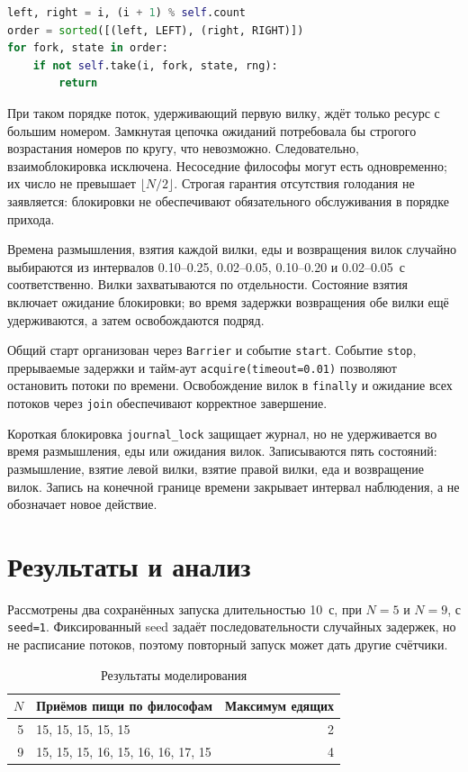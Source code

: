 \documentclass[a4paper,14pt]{extarticle}
\begin{document}
\begin{lstlisting}[language=Python,caption={Порядок захвата вилок}]
left, right = i, (i + 1) % self.count
order = sorted([(left, LEFT), (right, RIGHT)])
for fork, state in order:
    if not self.take(i, fork, state, rng):
        return
\end{lstlisting}

При таком порядке поток, удерживающий первую вилку, ждёт только ресурс
с большим номером. Замкнутая цепочка ожиданий потребовала бы строгого
возрастания номеров по кругу, что невозможно. Следовательно,
взаимоблокировка исключена. Несоседние философы могут есть одновременно;
их число не превышает $\lfloor N/2\rfloor$.
Строгая гарантия отсутствия голодания не заявляется: блокировки не
обеспечивают обязательного обслуживания в порядке прихода.

Времена размышления, взятия каждой вилки, еды и возвращения вилок
случайно выбираются из интервалов 0.10--0.25, 0.02--0.05,
0.10--0.20 и 0.02--0.05~с соответственно.
Вилки захватываются по отдельности. Состояние взятия включает ожидание
блокировки; во время задержки возвращения обе вилки ещё удерживаются,
а затем освобождаются подряд.

Общий старт организован через \texttt{Barrier} и событие \texttt{start}.
Событие \texttt{stop}, прерываемые задержки и тайм-аут
\texttt{acquire(timeout=0.01)} позволяют остановить потоки по времени.
Освобождение вилок в \texttt{finally} и ожидание всех потоков через
\texttt{join} обеспечивают корректное завершение.

Короткая блокировка \texttt{journal\_lock} защищает журнал, но не
удерживается во время размышления, еды или ожидания вилок.
Записываются пять состояний: размышление, взятие левой вилки,
взятие правой вилки, еда и возвращение вилок.
Запись на конечной границе времени закрывает интервал наблюдения,
а не обозначает новое действие.

\section{Результаты и анализ}
Рассмотрены два сохранённых запуска длительностью 10~с, при $N=5$ и
$N=9$, с \texttt{seed=1}. Фиксированный seed задаёт последовательности
случайных задержек, но не расписание потоков, поэтому повторный запуск
может дать другие счётчики.

\begin{table}[htbp]\centering
\caption{Результаты моделирования}
\small
\begin{tabular}{r l r}
\toprule
$N$ & Приёмов пищи по философам & Максимум едящих \\
\midrule
5 & 15, 15, 15, 15, 15 & 2 \\
9 & 15, 15, 15, 16, 15, 16, 16, 17, 15 & 4 \\
\bottomrule
\end{tabular}
\end{table}
\end{document}
